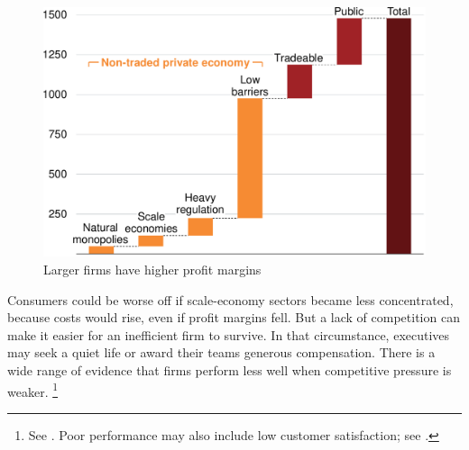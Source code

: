 \begin{figure}
    \caption{Larger firms have higher profit margins \label{fig:profit_margins_rank}}
    \includegraphics[page=27]{atlas/Charts} 
\end{figure}


Consumers could be worse off if scale-economy sectors became less concentrated, because costs would rise, even if profit margins fell.
But a lack of competition can make it easier for an inefficient firm to survive. In that circumstance, executives may seek a quiet life or award their teams generous compensation. There is a wide range of evidence that firms perform less well when competitive pressure is weaker.%
    \footnote{See \textcites{leibenstein1966allocative}{nickell1996competition}{joskow2007regulation}. Poor performance may also include low customer satisfaction; see \textcites{chen2014effect}{kimmelman2017communications}.}

